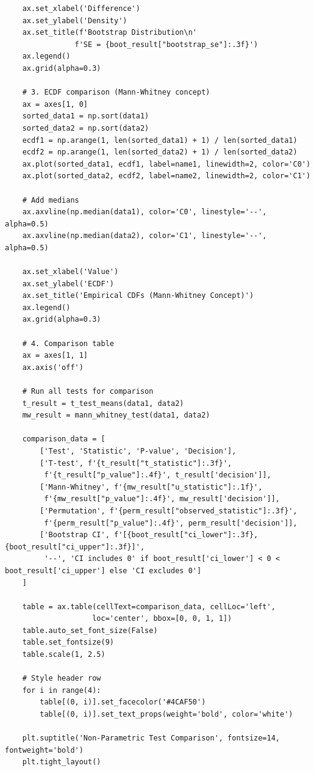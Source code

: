 \begin{lstlisting}
    ax.set_xlabel('Difference')
    ax.set_ylabel('Density')
    ax.set_title(f'Bootstrap Distribution\n'
                f'SE = {boot_result["bootstrap_se"]:.3f}')
    ax.legend()
    ax.grid(alpha=0.3)

    # 3. ECDF comparison (Mann-Whitney concept)
    ax = axes[1, 0]
    sorted_data1 = np.sort(data1)
    sorted_data2 = np.sort(data2)
    ecdf1 = np.arange(1, len(sorted_data1) + 1) / len(sorted_data1)
    ecdf2 = np.arange(1, len(sorted_data2) + 1) / len(sorted_data2)
    ax.plot(sorted_data1, ecdf1, label=name1, linewidth=2, color='C0')
    ax.plot(sorted_data2, ecdf2, label=name2, linewidth=2, color='C1')

    # Add medians
    ax.axvline(np.median(data1), color='C0', linestyle='--', alpha=0.5)
    ax.axvline(np.median(data2), color='C1', linestyle='--', alpha=0.5)

    ax.set_xlabel('Value')
    ax.set_ylabel('ECDF')
    ax.set_title('Empirical CDFs (Mann-Whitney Concept)')
    ax.legend()
    ax.grid(alpha=0.3)

    # 4. Comparison table
    ax = axes[1, 1]
    ax.axis('off')

    # Run all tests for comparison
    t_result = t_test_means(data1, data2)
    mw_result = mann_whitney_test(data1, data2)

    comparison_data = [
        ['Test', 'Statistic', 'P-value', 'Decision'],
        ['T-test', f'{t_result["t_statistic"]:.3f}',
         f'{t_result["p_value"]:.4f}', t_result['decision']],
        ['Mann-Whitney', f'{mw_result["u_statistic"]:.1f}',
         f'{mw_result["p_value"]:.4f}', mw_result['decision']],
        ['Permutation', f'{perm_result["observed_statistic"]:.3f}',
         f'{perm_result["p_value"]:.4f}', perm_result['decision']],
        ['Bootstrap CI', f'[{boot_result["ci_lower"]:.3f}, {boot_result["ci_upper"]:.3f}]',
         '--', 'CI includes 0' if boot_result['ci_lower'] < 0 < boot_result['ci_upper'] else 'CI excludes 0']
    ]

    table = ax.table(cellText=comparison_data, cellLoc='left',
                    loc='center', bbox=[0, 0, 1, 1])
    table.auto_set_font_size(False)
    table.set_fontsize(9)
    table.scale(1, 2.5)

    # Style header row
    for i in range(4):
        table[(0, i)].set_facecolor('#4CAF50')
        table[(0, i)].set_text_props(weight='bold', color='white')

    plt.suptitle('Non-Parametric Test Comparison', fontsize=14, fontweight='bold')
    plt.tight_layout()


\end{lstlisting}
